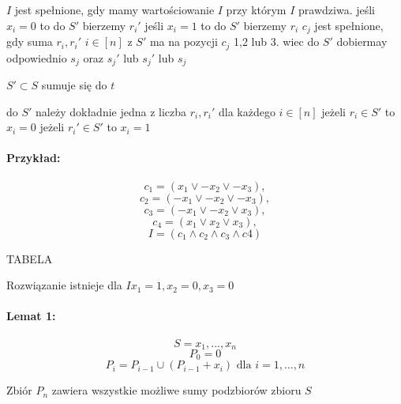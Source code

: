 $I$ jest spełnione, gdy mamy wartościowanie $I$ przy którym $I$ prawdziwa.
jeśli $x_i=0$ to do $S'$ bierzemy $r_i'$
jeśli $x_i=1$ to do $S'$ bierzemy $r_i$
$c_j$ jest spełnione, gdy suma $r_i, r_i'$  $i \in [n]$ z $S'$ ma na pozycji $c_j$  1,2 lub 3. wiec do $S'$ dobiermay odpowiednio $s_j$ oraz $s_j'$ lub $s_j'$ lub $s_j$
 
$S' \subset S$ sumuje się do $t$

do $S'$ należy dokładnie jedna z liczba $r_i, r_i'$ dla każdego $i \in [n]$
jeżeli $r_i  \in S'$ to $x_i = 0$
jeżeli $r_i' \in S'$ to $x_i = 1$

\paragraph{Przykład: }{
$$c_1=(x_1 \lor -x_2 \lor -x_3), $$
$$c_2=(-x_1 \lor -x_2 \lor -x_3),$$ 
$$c_3=(-x_1 \lor -x_2 \lor x_3), $$
$$c_4=(x_1 \lor x_2 \lor x_3),$$ 
$$I = (c_1 \land c_2 \land c_3 \land c4)$$
}

TABELA

Rozwiązanie istnieje dla $I  x_1=1 , x_2=0, x_3=0$

\paragraph{Lemat 1:}
$$S={x_1, ..., x_n}$$
$$P_0 = {0}$$
$$P_i = P_{i-1} \cup (P_{i-1} + x_i) \text{ dla } i=1, \ldots, n$$

Zbiór $P_n$ zawiera wszystkie możliwe sumy podzbiorów zbioru $S$

